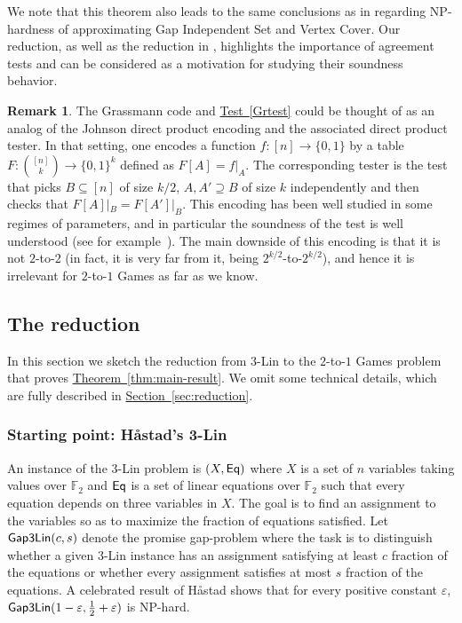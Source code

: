 \documentclass[11pt]{article}
\numberwithin{equation}{section}
\theoremstyle{definition}
\newtheorem{remark}[theorem]{Remark}
\theoremstyle{plain}
\newcommand{\expref}[2]{\hyperref[#2]{#1~\ref{#2}}}
\newcommand\eps{\varepsilon}
\begin{document}
We note that this theorem also leads to the same conclusions as in \cite{KMS} regarding NP-hardness of approximating %
%
%
Gap Independent Set and Vertex Cover.  %
Our reduction, as well as the reduction in  \cite{KMS}, highlights the
importance of agreement tests and can be considered as a motivation for studying
their soundness behavior.

\begin{remark}
  The Grassmann code and \expref{Test}{Grtest} could be thought of as an analog of the Johnson direct product encoding and the associated direct product tester. In that setting, one encodes a function $f\colon [n]\to\{0,1\}$ by a table $F\colon \binom{[n]}{k}\to\{0,1\}^k$ defined
  as $F[A] = f|_{A}$. The corresponding tester is the test that picks $B\subseteq [n]$ of size $k/2$, $A,A'\supseteq B$ of size $k$ independently
  and then checks that $F[A]|_{B} = F[A']|_{B}$. This encoding has been well studied in some regimes of parameters, and in particular the soundness
  of the test is well understood (see for example~\cite{IKW}). The main downside of this encoding is that it is not $2$-to-$2$ (in fact, it is
  very far from it, being $2^{k/2}$-to-$2^{k/2}$), and hence it is irrelevant for $2$-to-$1$ Games as far as we know.
\end{remark}


\subsection{The reduction}
In this section we sketch the reduction from $3$-Lin to the $2$-to-$1$ Games problem that
proves \expref{Theorem}{thm:main-result}. We omit some technical details, which are fully described in \expref{Section}{sec:reduction}.

\subsubsection{Starting point: H\aa stad's 3-Lin}
An instance of the $3$-Lin problem is
$(X, {\sf Eq})$ where $X$ is a set of $n$ variables taking values over ${\mathbb F}_2$ and ${\sf Eq}$ is a set of linear equations over
${\mathbb F}_2$ such that every equation depends on three variables in $X$. The goal is to find an assignment to the variables
so as to maximize the fraction of equations satisfied. Let ${\sf Gap3Lin}(c, s)$ denote the promise gap-problem
where the task is to distinguish whether a given $3$-Lin instance has an assignment satisfying at least $c$ fraction of
the equations or whether every assignment satisfies at most $s$ fraction of the equations.
A celebrated result of H\aa stad \cite{Has01} shows that for every positive constant $\eps$,
 ${\sf Gap3Lin}(1-\eps, \frac{1}{2}+\eps)$ is NP-hard.
\end{document}

